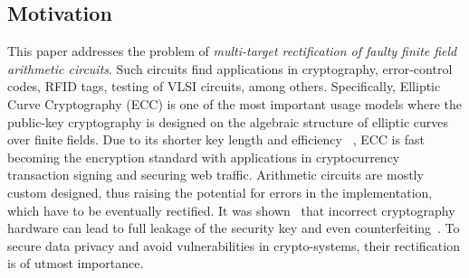 \subsection{Motivation}
This paper addresses the problem of {\it multi-target rectification
of faulty finite field arithmetic circuits}.
Such circuits find applications in cryptography,
error-control codes, RFID tags, testing of VLSI circuits, among 
others. Specifically, Elliptic Curve Cryptography (ECC) is one of 
the most important usage models where the public-key cryptography 
is designed on the algebraic structure of elliptic curves over 
finite fields. Due to its shorter key length and efficiency ~\cite{ecc_app:2016}, 
ECC is fast becoming the encryption standard with applications 
in cryptocurrency transaction signing and securing web traffic.
Arithmetic circuits are mostly custom designed, thus 
raising the potential for errors in the implementation, 
which have to be eventually rectified. 
It was shown~\cite{crypto:bug_attacks} that incorrect cryptography 
hardware can lead to full leakage of the security key and even
counterfeiting~\cite{crypto:counterfeit}.
To secure data privacy and avoid vulnerabilities in crypto-systems, their
rectification is of utmost importance.



